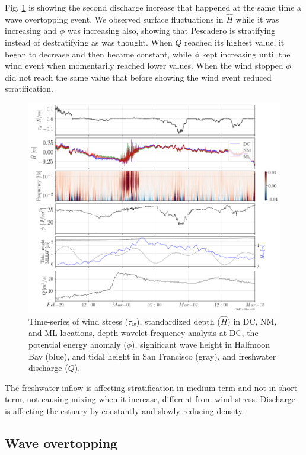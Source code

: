 \documentclass[tesis.tex]{subfiles}
\begin{document}
Fig. \ref{fig:mix_q} is showing the second discharge increase that happened at the same time a wave overtopping event. We observed surface fluctuations in $\hat{H}$ while it was increasing and $\phi$ was increasing also, showing that Pescadero is stratifying instead of destratifying as was thought. When $Q$ reached its highest value, it began to decrease and then became constant, while $\phi$ kept increasing until the wind event when momentarily reached lower values. When the wind stopped $\phi$ did not reach the same value that before showing the wind event reduced stratification.\\

\begin{figure}[h!]
    \centering
    \includegraphics[width=\textwidth]{Imagenes/mix_q2.png}
    \caption{Time-series of wind stress ($\tau_w$), standardized depth ($\hat{H}$) in DC, NM, and ML locations, depth wavelet frequency analysis at DC, the potential energy anomaly ($\phi$), significant wave height in Halfmoon Bay (blue), and tidal height in San Francisco (gray), and freshwater discharge ($Q$). }
    \label{fig:mix_q}
\end{figure}

The freshwater inflow is affecting stratification in medium term and not in short term, not causing mixing when it increase, different from wind stress. Discharge is affecting the estuary by constantly and slowly reducing density.\\

\subsection{Wave overtopping}
\end{document}
